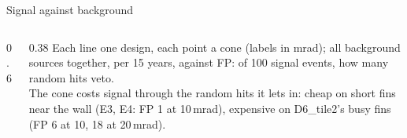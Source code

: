 \begin{frame}{Signal against background}
  \begin{columns}[c]
    \begin{column}{0.6\textwidth}
    \end{column}
    \begin{column}{0.38\textwidth}\footnotesize
      Each line one design, each point a cone (labels in mrad); all background sources together, per 15 years, against FP: of 100 signal events, how many random hits veto.\\[1.5mm]
      The cone costs signal through the random hits it lets in: cheap on short fins near the wall (E3, E4: FP 1 at 10\,mrad), expensive on D6\_tile2's busy fins (FP 6 at 10, 18 at 20\,mrad).\\[1.5mm]
    \end{column}
  \end{columns}
\end{frame}

